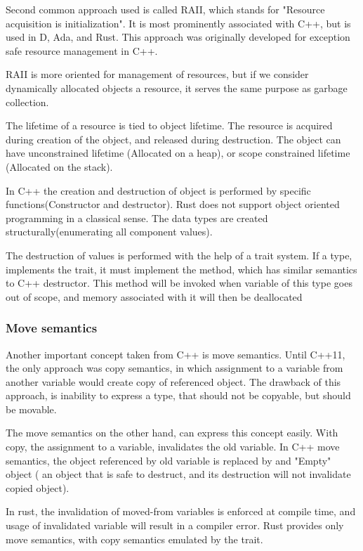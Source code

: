 Second common approach used is called RAII, which stands for "Resource acquisition is initialization". It is most
prominently associated with C++, but is used in D, Ada, and Rust. This approach was originally developed for exception safe
resource management in C++\cite{stroustrup2015brief}.

RAII is more oriented for management of resources, but if we consider dynamically allocated objects a resource, it serves
the same purpose as garbage collection.

The lifetime of a resource is tied to object lifetime. The resource is acquired during creation of the object,
and released during destruction. The object can have unconstrained lifetime (Allocated on a heap), or scope constrained
lifetime (Allocated on the stack).

In C++ the creation and destruction of object is performed by specific functions(Constructor and destructor). Rust does
not support object oriented programming in a classical sense. The data types are created structurally(enumerating all component values).

The destruction of values is performed with the help of a trait system. If a type, implements the  trait,
it must implement the  method, which has similar semantics to C++ destructor. This method will be invoked
when variable of this type goes out of scope, and memory associated with it will then be deallocated

\subsubsection{Move semantics}
Another important concept taken from C++ is move semantics. Until C++11, the only approach was copy semantics, in which
assignment to a variable from another variable would create copy of referenced object.
The drawback of this approach, is inability to express a type, that should not be copyable, but should be movable.

The move semantics on the other hand, can express this concept easily. With copy, the assignment to a variable, invalidates the
old variable. In C++ move semantics, the object referenced by old variable is replaced by and "Empty" object ( an object
that is safe to destruct, and its destruction will not invalidate copied object).

In rust, the invalidation of moved-from variables is enforced at compile time, and usage of invalidated variable will result in a
compiler error. Rust provides only move semantics, with copy semantics emulated by the  trait.

